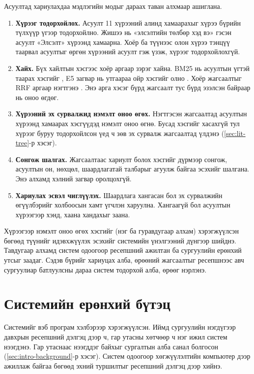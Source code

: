 Асуултад хариулахдаа мэдлэгийн модыг дараах таван алхмаар ашиглана.
\begin{enumerate}
    \item \textbf{Хүрээг тодорхойлох.} Асуулт 11 хүрээний алинд хамаарахыг хүрээ бүрийн түлхүүр үгээр тодорхойлно. Жишээ нь «элсэлтийн төлбөр хэд вэ» гэсэн асуулт «Элсэлт» хүрээнд хамаарна. Хоёр ба түүнээс олон хүрээ тэнцүү таарвал асуултыг өргөн хүрээний асуулт гэж үзэж, хүрээг тодорхойлохгүй.
    \item \textbf{Хайх.} Бүх хайлтын хэсгээс хоёр аргаар зэрэг хайна. BM25 нь асуултын үгтэй таарах хэсгийг \cite{robertson2009bm25}, E5 загвар нь утгаараа ойр хэсгийг олно \cite{wang2024me5}. Хоёр жагсаалтыг \acs{RRF} аргаар нэгтгэнэ \cite{cormack2009rrf}. Энэ арга хэсэг бүрд жагсаалт тус бүрд эзэлсэн байраар нь оноо өгдөг.
    \item \textbf{Хүрээний эх сурвалжид нэмэлт оноо өгөх.} Нэгтгэсэн жагсаалтад асуултын хүрээнд хамаарах хэсгүүдэд нэмэлт оноо өгнө. Бусад хэсгийг хасахгүй тул хүрээг буруу тодорхойлсон үед ч зөв эх сурвалж жагсаалтад үлдэнэ (\ref{sec:lit-tree}-р хэсэг).
    \item \textbf{Сонгож шалгах.} Жагсаалтаас хариулт болох хэсгийг дүрмээр сонгож, асуултын он, нөхцөл, шаардлагатай талбарыг агуулж байгаа эсэхийг шалгана. Энэ алхамд хэлний загвар оролцохгүй.
    \item \textbf{Хариулах эсвэл чиглүүлэх.} Шаардлага хангасан бол эх сурвалжийн өгүүлбэрийг холбоосын хамт үгчлэн харуулна. Хангаагүй бол асуултын хүрээгээр хэнд, хаана хандахыг заана.
\end{enumerate}

Хүрээгээр нэмэлт оноо өгөх хэсгийг (нэг ба гуравдугаар алхам) хэрэгжүүлсэн бөгөөд түүнийг идэвхжүүлэх эсэхийг системийн үнэлгээний дүнгээр шийднэ. Тавдугаар алхамд систем одоогоор ресепшний ажилтан ба сургуулийн ерөнхий утсыг заадаг. Сэдэв бүрийг хариуцах алба, өрөөний жагсаалтыг ресепшнээс авч сургуулиар батлуулсны дараа систем тодорхой алба, өрөөг нэрлэнэ.

\section{Системийн ерөнхий бүтэц}
\label{sec:system}

Системийг вэб програм хэлбэрээр хэрэгжүүлсэн. Иймд сургуулийн нэгдүгээр давхрын ресепшний дэлгэц дээр ч, гар утасны хөтчөөр ч нэг ижил систем нээгдэнэ. Гар утаснаас нээгддэг байхыг сургалтын алба санал болгосон (\ref{sec:intro-background}-р хэсэг). Систем одоогоор хөгжүүлэлтийн компьютер дээр ажиллаж байгаа бөгөөд эхний туршилтыг ресепшний дэлгэц дээр хийнэ.

